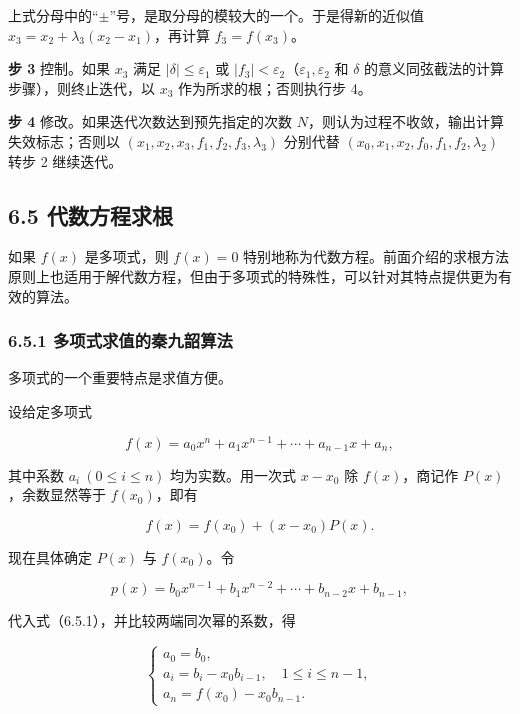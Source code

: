 \documentclass[
  10pt,
  fontset=fandol]{ctexart}
\begin{document}
上式分母中的``\(\pm\)''号，是取分母的模较大的一个。于是得新的近似值 \(x_3=x_2+\lambda_3(x_2-x_1)\)，再计算 \(f_3=f(x_3)\)。

\textbf{步 3} 控制。如果 \(x_3\) 满足 \(|\delta|\leqslant\varepsilon_1\) 或 \(|f_3|<\varepsilon_2\)（\(\varepsilon_1,\varepsilon_2\) 和 \(\delta\) 的意义同弦截法的计算步骤），则终止迭代，以 \(x_3\) 作为所求的根；否则执行步 4。

\textbf{步 4} 修改。如果迭代次数达到预先指定的次数 \(N\)，则认为过程不收敛，输出计算失效标志；否则以 \((x_1,\allowbreak x_2,\allowbreak x_3,\allowbreak f_1,\allowbreak f_2,\allowbreak f_3,\allowbreak \lambda_3)\) 分别代替 \((x_0,\allowbreak x_1,\allowbreak x_2,\allowbreak f_0,\allowbreak f_1,\allowbreak f_2,\allowbreak \lambda_2)\) 转步 2 继续迭代。

\subsection{6.5 代数方程求根}\label{ux4ee3ux6570ux65b9ux7a0bux6c42ux6839}

如果 \(f(x)\) 是多项式，则 \(f(x)=0\) 特别地称为代数方程。前面介绍的求根方法原则上也适用于解代数方程，但由于多项式的特殊性，可以针对其特点提供更为有效的算法。

\subsubsection{6.5.1 多项式求值的秦九韶算法}\label{ux591aux9879ux5f0fux6c42ux503cux7684ux79e6ux4e5dux97f6ux7b97ux6cd5}

多项式的一个重要特点是求值方便。

设给定多项式

\[
f(x)=a_0x^n+a_1x^{n-1}+\cdots+a_{n-1}x+a_n,
\]

其中系数 \(a_i\ (0\leqslant i\leqslant n)\) 均为实数。用一次式 \(x-x_0\) 除 \(f(x)\)，商记作 \(P(x)\)，余数显然等于 \(f(x_0)\)，即有

\[
f(x)=f(x_0)+(x-x_0)P(x).
\tag{6.5.1}
\]

现在具体确定 \(P(x)\) 与 \(f(x_0)\)。令

\[
p(x)=b_0x^{n-1}+b_1x^{n-2}+\cdots+b_{n-2}x+b_{n-1},
\]

代入式（6.5.1），并比较两端同次幂的系数，得

\[
\begin{cases}
a_0=b_0,\\
a_i=b_i-x_0b_{i-1},\quad1\leqslant i\leqslant n-1,\\
a_n=f(x_0)-x_0b_{n-1}.
\end{cases}
\]
\end{document}
